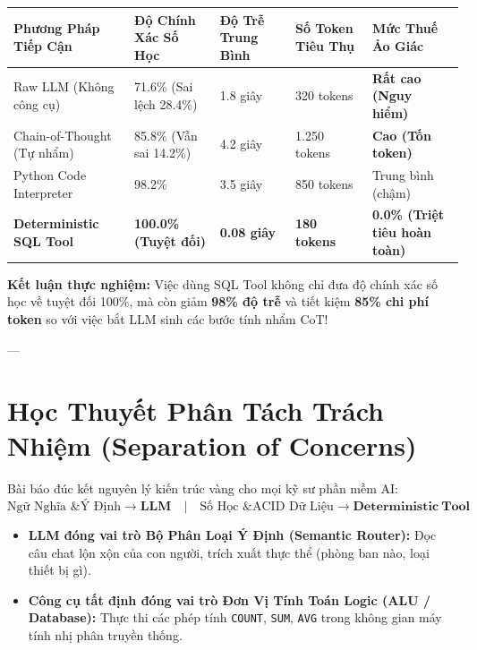 \documentclass[11pt,a4paper]{article}
\begin{document}
\begin{benchmarkbox}
\begin{table}[H]
\centering
\small
\begin{tabularx}{\textwidth}{lXXXX}
\toprule
\textbf{Phương Pháp Tiếp Cận} & \textbf{Độ Chính Xác Số Học} & \textbf{Độ Trễ Trung Bình} & \textbf{Số Token Tiêu Thụ} & \textbf{Mức Thuế Ảo Giác} \\
\midrule
Raw LLM (Không công cụ) & 71.6\% (Sai lệch 28.4\%) & 1.8 giây & 320 tokens & \textbf{Rất cao (Nguy hiểm)} \\
Chain-of-Thought (Tự nhẩm) & 85.8\% (Vẫn sai 14.2\%) & 4.2 giây & 1.250 tokens & \textbf{Cao (Tốn token)} \\
Python Code Interpreter & 98.2\% & 3.5 giây & 850 tokens & Trung bình (chậm) \\
\textbf{Deterministic SQL Tool} & \textbf{100.0\% (Tuyệt đối)} & \textbf{0.08 giây} & \textbf{180 tokens} & \textbf{0.0\% (Triệt tiêu hoàn toàn)} \\
\bottomrule
\end{tabularx}
\end{table}
\textbf{Kết luận thực nghiệm:} Việc dùng SQL Tool không chỉ đưa độ chính xác số học về tuyệt đối 100\%, mà còn giảm \textbf{98\% độ trễ} và tiết kiệm \textbf{85\% chi phí token} so với việc bắt LLM sinh các bước tính nhẩm CoT!
\end{benchmarkbox}

---

\section{Học Thuyết Phân Tách Trách Nhiệm (Separation of Concerns)}

Bài báo đúc kết nguyên lý kiến trúc vàng cho mọi kỹ sư phần mềm AI:
\begin{equation}
    \boxed{\text{Ngữ Nghĩa \& Ý Định} \longrightarrow \mathbf{LLM}} \quad \Big| \quad \boxed{\text{Số Học \& ACID Dữ Liệu} \longrightarrow \mathbf{Deterministic\ Tool}}
\end{equation}
\begin{itemize}[leftmargin=1.5em]
    \item \textbf{LLM đóng vai trò Bộ Phân Loại Ý Định (Semantic Router):} Đọc câu chat lộn xộn của con người, trích xuất thực thể (phòng ban nào, loại thiết bị gì).
    \item \textbf{Công cụ tất định đóng vai trò Đơn Vị Tính Toán Logic (ALU / Database):} Thực thi các phép tính \texttt{COUNT}, \texttt{SUM}, \texttt{AVG} trong không gian máy tính nhị phân truyền thống.
\end{itemize}
\end{document}
